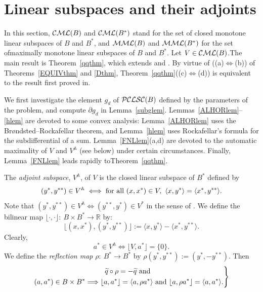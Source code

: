 \documentclass[letterpaper]{article}
\theoremstyle{plain}
\theoremstyle{definition}
\numberwithin{equation}{section}
\newcommand{\A}{{\mathbb A}}
\newcommand{\all}{\hbox{for all}}
\newcommand{\bra}[2]{\langle#1,#2\rangle}
\newcommand{\CML}{{\cal CML}}
\newcommand{\dbs}{^{**}}
\newcommand{\lr}{\Longrightarrow}
\newcommand{\MML}{{\cal MML}}
\newcommand{\PCLSC}{{\cal PCLSC}}
\newcommand{\qt}{\wt q}
\newcommand{\RR}{\mathbb R}
\newcommand{\wt}{\widetilde}
\newcommand{\xbra}[2]{\lfloor#1,#2\rfloor}
\newcommand{\Xbra}[2]{\big\lfloor#1,#2\big\rfloor}
\newcommand{\Lem}{Lemma~\ref}
\newcommand{\Lems}{Lemmas~\ref}
\newcommand{\Thm}{Theorem~\ref}
\newcommand{\Thms}{Theorems~\ref}
\begin{document}
\section{Linear subspaces and their adjoints}\label{LINsec}
%
In this section, $\CML(B)$ and $\CML(B^*)$ stand for the set of closed monotone linear subspaces of $B$ and $B^*$, and $\MML(B)$ and $\MML(B^*)$ for the set of\break maximally monotone linear subspaces of $B$ and $B^*$.   Let $V \in \CML(B)$.\break  The main result is \Thm{qqthm}, which extends \cite[Theorem 6.4, p.\ 269]{POLAR} and \cite[Corollary 6.6, p.\ 269]{POLAR}. By virtue of \big((a)$\iff$(b)\big) of \Thms{EQUIVthm} and \ref{Dthm}, \Thm{qqthm}\big((c)$\iff$(d)\big) is equivalent to the result first proved in\break \cite[Theorem 4.1, p.\ 4960]{BBWYBB}.
\par
We first investigate the element $g_d$ of $\PCLSC(B)$ defined by the parameters of the problem,
and compute $\partial g_d$ in \Lem{subglem}. \Lems{ALHORlem}--\ref{hlem} are devoted to some convex analysis: \Lem{ALHORlem} uses the Br\o ndsted--Rockafellar theorem, and \Lem{hlem} uses Rockafellar's formula for the subdifferential of a sum.  \Lem{FNLlem}(a,d) are devoted to the automatic maximality of $V$ and $V^\A$ (see below) under certain circumstances.   Finally, \Lem{FNLlem} leads rapidly to\break \Thm{qqthm}.         
\par
The {\em adjoint subspace}, $V^\A$, of $V$ is the closed linear subspace of $B^*$ defined by
\begin{equation}\label{OLDADJdef}
(y^*,y\dbs) \in V^\A \iff \all\ (x,x^*) \in V,\ \bra{x}{y^*} = \bra{x^*}{y\dbs}.  
\end{equation}
%
Note that $(y^*,y\dbs) \in V^\A \iff (y\dbs,y^*) \in V^*$ in the sense of \cite{BBWYBB}. We define the bilinear map $\xbra{\cdot}{\cdot} \colon\ B \times B^* \to \RR$ by: 
%
$$\xbra{(x,x^*)}{(y^*,y\dbs)}:=  \bra{x}{y^*} - \bra{x^*}{y\dbs}.$$ 
%
Clearly,
\begin{equation}\label{XADJdef}
a^* \in V^\A \iff \Xbra{V}{a^*} = \{0\}.  
\end{equation}
We define the {\em reflection map} $\rho\colon\ B^* \to B^*$ by  $\rho(y^*,y\dbs) := (y^*,-y\dbs)$.
Then
\begin{equation}\label{rhoprops}
\left.
\begin{gathered}
\qt \circ \rho = -\qt\hbox{ and }\\
 (a,a^*) \in B \times B^* \lr \xbra{a}{a^*} = \bra{a}{\rho a^*}\hbox{ and } \xbra{a}{\rho a^*} = \bra{a}{a^*}.  
\end{gathered}
\right\}
\end{equation}
\end{document}
